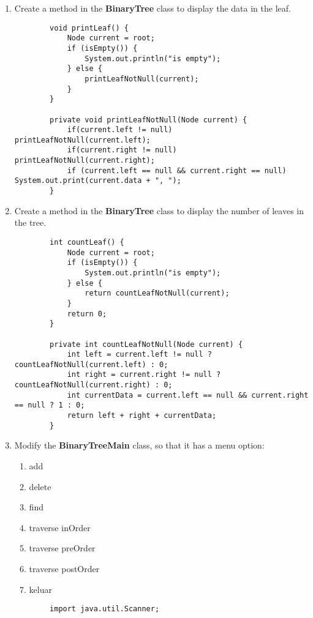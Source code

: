 \documentclass[12pt,titlepage]{article}
\begin{document}
\begin{enumerate}
\begin{verbatim}
        private void printSearch(Node current, boolean isLeft) {
            if (isLeft && current.left != null) {
                current = current.left;
                printSearch(current, isLeft);
            } else if (!isLeft && current.right != null) {
                current = current.right;
                printSearch(current, isLeft);
            } else {
                System.out.printf("%s: %d \n", isLeft ? "Smallest" : "Largest", current.data);
            }
        }
    \end{verbatim}
    \item Create a method in the \textbf{BinaryTree} class to display the data in the leaf.
    \begin{verbatim}
        void printLeaf() {
            Node current = root;
            if (isEmpty()) {
                System.out.println("is empty");
            } else {
                printLeafNotNull(current);
            }
        }

        private void printLeafNotNull(Node current) {
            if(current.left != null) printLeafNotNull(current.left);
            if(current.right != null) printLeafNotNull(current.right);
            if (current.left == null && current.right == null) System.out.print(current.data + ", ");
        }
    \end{verbatim}
    \item Create a method in the \textbf{BinaryTree} class to display the number of leaves in the tree.
    \begin{verbatim}
        int countLeaf() {
            Node current = root;
            if (isEmpty()) {
                System.out.println("is empty");
            } else {
                return countLeafNotNull(current);
            }
            return 0;
        }

        private int countLeafNotNull(Node current) {
            int left = current.left != null ? countLeafNotNull(current.left) : 0;
            int right = current.right != null ? countLeafNotNull(current.right) : 0;
            int currentData = current.left == null && current.right == null ? 1 : 0;
            return left + right + currentData;
        }
    \end{verbatim}
    \item Modify the \textbf{BinaryTreeMain} class, so that it has a menu option:
    \begin{enumerate}[label=\alph*.]
        \item add
        \item delete
        \item find
        \item traverse inOrder
        \item traverse preOrder
        \item traverse postOrder
        \item keluar
    \end{enumerate}
    \begin{verbatim}
        import java.util.Scanner;


\end{verbatim}
\end{enumerate}
\end{document}
